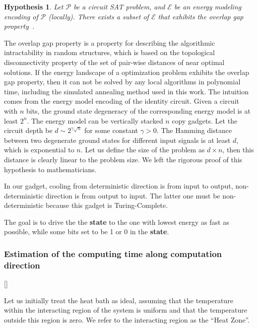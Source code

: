 \documentclass[twocolumn,superscriptaddress,english,showpacs,longbibliography]{revtex4-2}
\newtheorem{hyp}{Hypothesis}
\newcommand{\ym}[1]{[{\color{red}{YM: #1}}]}
\begin{document}
\begin{hyp}
Let $\mathcal{P}$ be a circuit SAT problem, and $\mathcal{E}$ be an energy modeling encoding of $\mathcal{P}$ (locally). There exists a subset of $\mathcal{E}$ that exhibits the overlap gap property~\cite{Gamarnik2021}.
\end{hyp}
The overlap gap property is a property for describing the algorithmic intractability in random structures, which is based on the topological disconnectivity property of the set of pair-wise distances of near optimal solutions.
If the energy landscape of a optimization problem exhibits the overlap gap property, then it can not be solved by any local algorithms in polynomial time, including the simulated annealing method used in this work.
The intuition comes from the energy model encoding of the identity circuit.
Given a circuit with $n$ bits, the ground state degeneracy of the corresponding energy model is at least $2^n$.
The energy model can be vertically stacked $n$ copy gadgets.
Let the circuit depth be $d \sim 2^{\gamma \sqrt{n}}$ for some constant $\gamma > 0$.
The Hamming distance between two degenerate ground states for different input signals is at least $d$, which is exponential to $n$. Let us define the size of the problem as $d\times n$, then this distance is clearly linear to the problem size. We left the rigorous proof of this hypothesis to mathematicians.

In our gadget, cooling from deterministic direction is from input to
output, non-deterministic direction is from output to input. The latter
one must be non-deterministic because this gadget is Turing-Complete.

The goal is to drive the the \textbf{state} to the one with lowest energy as fast as possible, while some bits set to be 1 or 0 in the \textbf{state}.

\subsubsection{Estimation of the computing time along computation direction}\label{estimation-of-the-computing-time}

\ym{This part should be rewrote in future..My words are so poor.}

Let us initially treat the heat bath as ideal, assuming that the temperature within the interacting region of the system is uniform and that the temperature outside this region is zero. We refer to the interacting region as the ``Heat Zone''.
\end{document}
